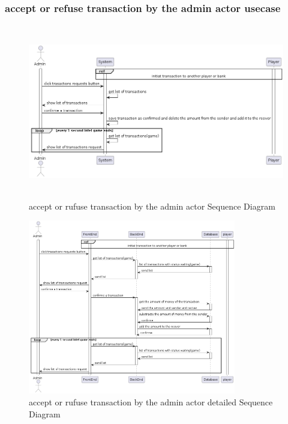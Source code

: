 \documentclass{article}
\begin{document}
\subsubsection{accept or refuse transaction by the admin actor usecase}
 \begin{figure}[H]
	 \centering
	 \includegraphics[height=3in]{../thesis_tex/assets/diagrams/accept_refuse_transaction_SD.png}
	 \caption{accept or rufuse transaction by the admin actor Sequence Diagram}
\end{figure}

 \begin{figure}[H]
	 \centering
	 \includegraphics[height=3in]{../thesis_tex/assets/diagrams/accept_refuse_transaction_detailedSD.png}
	 \caption{accept or rufuse transaction by the admin actor detailed Sequence Diagram}
\end{figure}
\end{document}
